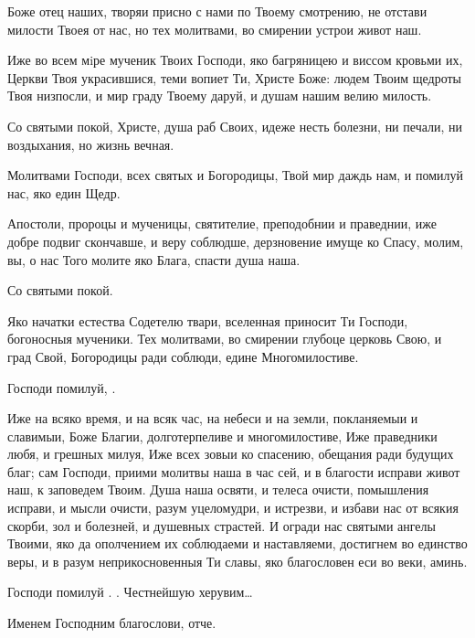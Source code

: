 \begin{mymulticols}
 Боже отец наших, творяи присно с нами по Твоему смотрению, не отстави милости Твоея от нас, но тех молитвами, во смирении устрои живот наш.


 Иже во всем мiре мученик Твоих Господи, яко багряницею и виссом кровьми их, Церкви Твоя украсившися, теми вопиет Ти, Христе Боже: людем Твоим щедроты Твоя низпосли, и мир граду Твоему даруй, и душам нашим велию милость.

 Со святыми покой, Христе, душа раб Своих, идеже несть болезни, ни печали, ни воздыхания, но жизнь вечная.

 Молитвами Господи, всех святых и Богородицы, Твой мир даждь нам, и помилуй нас, яко един Щедр.


 Апостоли, пророцы и мученицы, святителие, преподобнии и праведнии, иже добре подвиг скончавше, и веру соблюдше, дерзновение имуще ко Спасу, молим, вы, о нас Того молите яко Блага, спасти душа наша.


 Со святыми покой.


 Яко начатки естества Содетелю твари, вселенная приносит Ти Господи, богоносныя мученики. Тех молитвами, во смирении глубоце церковь Свою, и град Свой, Богородицы ради соблюди, едине Многомилостиве.


 Господи помилуй, .


 Иже на всяко время, и на всяк час, на небеси и на земли, покланяемыи и славимыи, Боже Благии, долготерпеливе и многомилостиве, Иже праведники любя, и грешных милуя, Иже всех зовыи ко спасению, обещания ради будущих благ; сам Господи, приими молитвы наша в час сей, и в благости исправи живот наш, к заповедем Твоим. Душа наша освяти, и телеса очисти, помышления исправи, и мысли очисти, разум уцеломудри, и истрезви, и избави нас от всякия скорби, зол и болезней, и душевных страстей. И огради нас святыми ангелы Твоими, яко да ополчением их соблюдаеми и наставляеми, достигнем во единство веры, и в разум неприкосновенныя Ти славы, яко благословен еси во веки, аминь.

Господи помилуй . . Честнейшую херувим…

Именем Господним благослови, отче. 


\end{mymulticols}

